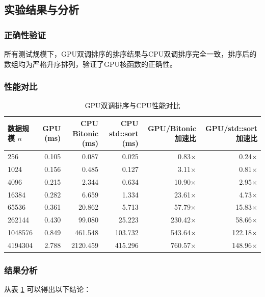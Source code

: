 \documentclass[UTF8,a4paper,10pt]{ctexart}
\begin{document}
\subsection{实验结果与分析}

\subsubsection{正确性验证}

所有测试规模下，GPU双调排序的排序结果与CPU双调排序完全一致，排序后的数组均为严格升序排列，验证了GPU核函数的正确性。

\subsubsection{性能对比}

\begin{table}[H]
\centering
\caption{GPU双调排序与CPU性能对比}
\label{tab:results}
\begin{tabular}{lrrrrr}
\toprule
数据规模 $n$ & GPU (ms) & CPU Bitonic (ms) & CPU std::sort (ms) & GPU/Bitonic 加速比 & GPU/std::sort 加速比 \\
\midrule
256      & 0.105 & 0.087   & 0.025   & 0.83$\times$   & 0.24$\times$ \\
1024     & 0.156 & 0.485   & 0.127   & 3.11$\times$   & 0.81$\times$ \\
4096     & 0.215 & 2.344   & 0.634   & 10.90$\times$  & 2.95$\times$ \\
16384    & 0.282 & 6.659   & 1.334   & 23.61$\times$  & 4.73$\times$ \\
65536    & 0.361 & 20.862  & 5.713   & 57.79$\times$  & 15.83$\times$ \\
262144   & 0.430 & 99.080  & 25.223  & 230.42$\times$ & 58.66$\times$ \\
1048576  & 0.849 & 461.548 & 103.732 & 543.64$\times$ & 122.18$\times$ \\
4194304  & 2.788 & 2120.459& 415.296 & 760.57$\times$ & 148.96$\times$ \\
\bottomrule
\end{tabular}
\end{table}

\subsubsection{结果分析}

从表 \ref{tab:results} 可以得出以下结论：
\end{document}
